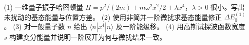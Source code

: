 (1) 一维量子振子哈密顿量 \(H=p^2/(2m)+m\omega^2x^2/2+\lambda x^4\)，\(\lambda>0\) 很小。写出未扰动的基态能量与位置方差。
(2) 使用非简并一阶微扰求基态能量修正 \(\Delta E_0^{(1)}\)。
(3) 对一般量子数 \(n\) 给出 \(\langle n|x^4|n\rangle\) 及一阶能级移。
(4) 用高斯试探波函数宽度 \(s\) 构建变分能量并说明一阶展开为何与微扰结果一致。
